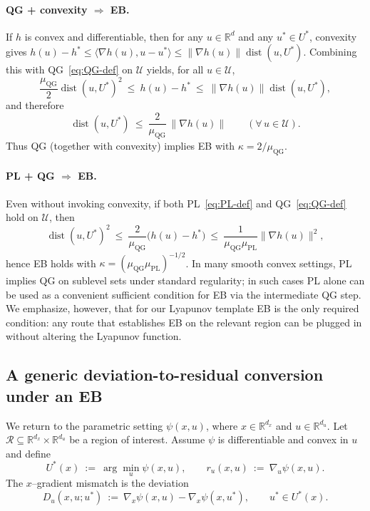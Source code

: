 \documentclass{article}
\newcommand{\1}{\mathbf{1}}
\begin{document}
\paragraph{QG + convexity $\Rightarrow$ EB.}
If $h$ is convex and differentiable, then for any $u\in\mathbb R^d$ and any $u^*\in U^*$,
convexity gives
$h(u)-h^* \le \langle \nabla h(u),u-u^*\rangle \le \|\nabla h(u)\|\operatorname{dist}(u,U^*)$.
Combining this with QG~\eqref{eq:QG-def} on $\mathcal U$ yields, for all $u\in\mathcal U$,
\[
\frac{\mu_{\mathrm{QG}}}{2}\operatorname{dist}(u,U^*)^2
\ \le\ h(u)-h^*
\ \le\ \|\nabla h(u)\|\operatorname{dist}(u,U^*),
\]
and therefore
\begin{equation}\label{eq:QG-implies-EB}
\operatorname{dist}(u,U^*)\ \le\ \frac{2}{\mu_{\mathrm{QG}}}\,\|\nabla h(u)\|
\qquad(\forall\,u\in\mathcal U).
\end{equation}
Thus QG (together with convexity) implies EB with $\kappa=2/\mu_{\mathrm{QG}}$.

\paragraph{PL + QG $\Rightarrow$ EB.}
Even without invoking convexity, if both PL~\eqref{eq:PL-def} and QG~\eqref{eq:QG-def} hold on $\mathcal U$, then
\[
\operatorname{dist}(u,U^*)^2 \ \le\ \frac{2}{\mu_{\mathrm{QG}}}\bigl(h(u)-h^*\bigr)
\ \le\ \frac{1}{\mu_{\mathrm{QG}}\mu_{\mathrm{PL}}}\|\nabla h(u)\|^2,
\]
hence EB holds with $\kappa = (\mu_{\mathrm{QG}}\mu_{\mathrm{PL}})^{-1/2}$.
In many smooth convex settings, PL implies QG on sublevel sets under standard regularity;
in such cases PL alone can be used as a convenient sufficient condition for EB via the intermediate QG step.
We emphasize, however, that for our Lyapunov template EB is the only required condition:
any route that establishes EB on the relevant region can be plugged in without altering the Lyapunov function. 

\subsection{A generic deviation-to-residual conversion under an EB}\label{app:eb-interface}

We return to the parametric setting $\psi(x,u)$, where $x\in\mathbb R^{d_x}$ and $u\in\mathbb R^{d_u}$.
Let $\mathcal R\subseteq\mathbb R^{d_x}\times\mathbb R^{d_u}$ be a region of interest.
Assume $\psi$ is differentiable and convex in $u$ and define
\[
U^*(x)\ :=\ \arg\min_u \psi(x,u),
\qquad
r_u(x,u)\ :=\ \nabla_u \psi(x,u).
\]
The $x$--gradient mismatch is the deviation
\[
D_u(x,u;u^*)\ :=\ \nabla_x\psi(x,u)-\nabla_x\psi(x,u^*),
\qquad u^*\in U^*(x).
\]
\end{document}
